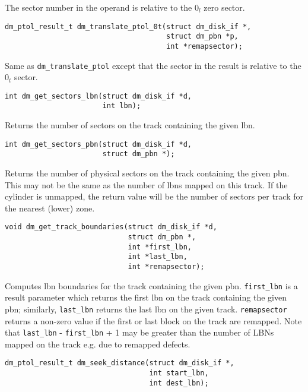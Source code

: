 The sector number in the operand is relative to the $0_l$ zero sector.

\begin{verbatim}
dm_ptol_result_t dm_translate_ptol_0t(struct dm_disk_if *, 
                                      struct dm_pbn *p,
                                      int *remapsector);
\end{verbatim}

Same as \texttt{dm\_translate\_ptol} except that the sector in the result
is relative to the $0_t$ sector.



\begin{verbatim}
int dm_get_sectors_lbn(struct dm_disk_if *d,
                       int lbn);
\end{verbatim}

Returns the number of sectors on the track containing the given lbn.


\begin{verbatim}
int dm_get_sectors_pbn(struct dm_disk_if *d,
                       struct dm_pbn *);
\end{verbatim}

Returns the number of physical sectors on the track containing the
given pbn.  This may not be the same as the number of lbns mapped on
this track.  If the cylinder is unmapped, the return value will be the
number of sectors per track for the nearest (lower) zone.


\begin{verbatim}
void dm_get_track_boundaries(struct dm_disk_if *d,
                             struct dm_pbn *,
                             int *first_lbn,
                             int *last_lbn,
                             int *remapsector);
\end{verbatim}

Computes lbn boundaries for the track containing the given pbn.
\texttt{first\_lbn} is a result parameter which returns the first lbn
on the track containing the given pbn; similarly, \texttt{last\_lbn}
returns the last lbn on the given track.  \texttt{remapsector} returns
a non-zero value if the first or last block on the track are remapped.
Note that \texttt{last\_lbn} - \texttt{first\_lbn} + 1 may be greater
than the number of LBNs mapped on the track e.g. due to remapped defects.


\begin{verbatim}
dm_ptol_result_t dm_seek_distance(struct dm_disk_if *,
                                  int start_lbn,
                                  int dest_lbn);
\end{verbatim}

